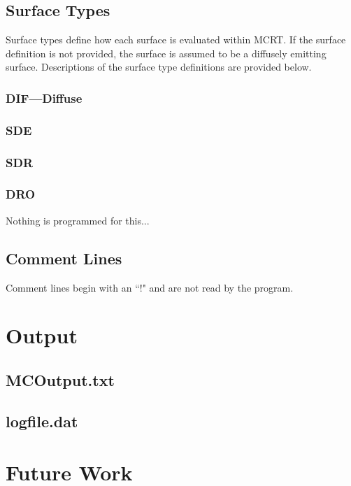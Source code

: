 \documentclass{article}
\begin{document}
\subsection{Surface Types}
\label{subsec:surftypes}
Surface types define how each surface is evaluated within MCRT. If the surface definition is not provided, the surface is assumed to be a diffusely emitting surface. Descriptions of the surface type definitions are provided below.

\subsubsection{DIF---Diffuse}
\label{s-s-sec:dif}

\subsubsection{SDE}

\subsubsection{SDR}

\subsubsection{DRO}
Nothing is programmed for this...

\subsection{Comment Lines}
\label{subsec:comments}
Comment lines begin with an ``!" and are not read by the program.

\section{Output}
\label{sec:output}

\subsection{MCOutput.txt}

\subsection{logfile.dat}


\section{Future Work}
\label{sec:future work}
\end{document}
